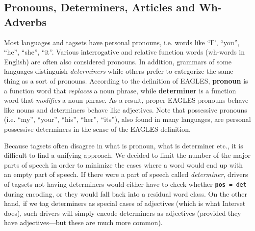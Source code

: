 \documentclass[11pt]{article}
\newcommand{\XXX}{\textcolor{red}{XXX }} %
\begin{document}
\subsection{Pronouns, Determiners, Articles and Wh-Adverbs}
\label{sec:pronouns}

Most languages and tagsets have personal pronouns, i.e. words like ``I'', ``you'', ``he'', ``she'', ``it''. Various interrogative and relative function words (wh-words in English) are often also considered pronouns. In addition, grammars of some languages distinguish \textit{determiners} while others prefer to categorize the same thing as a sort of pronouns. According to the definition of EAGLES, \textbf{pronoun} is a function word that \textit{replaces} a noun phrase, while \textbf{determiner} is a function word that \textit{modifies} a noun phrase. As a result, proper EAGLES-pronouns behave like nouns and determiners behave like adjectives. Note that possessive pronouns (i.e. ``my'', ``your'', ``his'', ``her'', ``its''), also found in many languages, are personal possessive determiners in the sense of the EAGLES definition.



Because tagsets often disagree in what is pronoun, what is determiner etc., it is difficult to find a unifying approach. We decided to limit the number of the major parts of speech in order to minimize the cases where a word would end up with an empty part of speech. If there were a part of speech called \textit{determiner}, drivers of tagsets not having determiners would either have to check whether \texttt{\textbf{pos} = det} during encoding, or they would fall back into a residual word class. On the other hand, if we tag determiners as special cases of adjectives (which is what Interset does), such drivers will simply encode determiners as adjectives (provided they have adjectives—but these are much more common).
\end{document}
